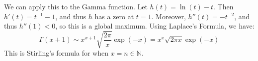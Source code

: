 \documentclass[crop=false,class=book,oneside]{standalone}
\begin{document}
        We can apply this to the Gamma function. Let
        $h(t)=\ln(t)-t$. Then $h'(t)=t^{-1}-1$, and thus $h$
        has a zero at $t=1$. Moreover, $h''(t)=\minus{t}^{-2}$,
        and thus $h''(1)<0$, so this is a global maximum.
        Using Laplace's Formula, we have:
        \begin{equation}
            \Gamma(x+1)\sim{x}^{x+1}
            \sqrt{\frac{2\pi}{x}}\exp(\minus{x})
            =x^{x}\sqrt{2\pi{x}}\exp(\minus{x})
        \end{equation}
        This is Stirling's formula for when $x=n\in\mathbb{N}$.
\end{document}
